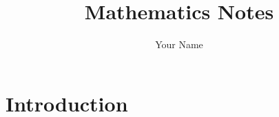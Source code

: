 \documentclass{article}
\title{Mathematics Notes}
\author{Your Name}
\begin{document}
\maketitle

\tableofcontents

\section{Introduction}


\end{document}
